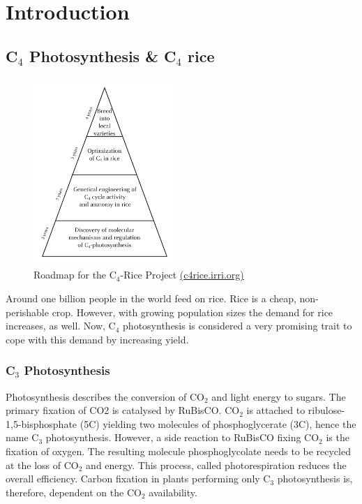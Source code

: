 \chapter{Introduction}
\section{C$_4$ Photosynthesis \& C$_4$ rice}

\begin{figure}%
	\includegraphics[width=0.48\textwidth]{images/C4_roadmap}%
	\caption{Roadmap for the C$_4$-Rice Project \href{http://c4rice.irri.org}{(c4rice.irri.org)}}%
	\label{fig:c4rice_roadmap}%
\end{figure}

Around one billion people in the world feed on rice.
Rice is a cheap, non-perishable crop.
However, with growing population sizes the demand for rice increases, as well.
Now, C$_4$ photosynthesis is considered a very promising trait to cope with this demand by increasing yield.
\subsection{C$_3$ Photosynthesis}
Photosynthesis describes the conversion of CO$_2$ and light energy to sugars.
The primary fixation of CO2 is catalysed by \ac{RuBisCO}.
CO$_2$ is attached to ribulose-1,5-bisphosphate (5C) yielding two molecules of phosphoglycerate (3C), hence the name C$_3$ photosynthesis.
However, a side reaction to \ac{RuBisCO} fixing CO$_2$ is the fixation of oxygen.
The resulting molecule phosphoglycolate needs to be recycled at the loss of CO$_2$ and energy.
This process, called photorespiration reduces the overall efficiency.
Carbon fixation in plants performing only C$_3$ photosynthesis is, therefore, dependent on the CO$_2$ availability.
